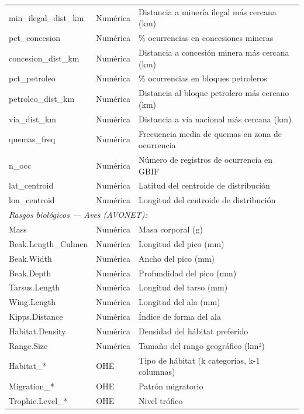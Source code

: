 \documentclass[12pt,a4paper]{article}
\begin{document}
\begin{longtable}{p{4.5cm}p{1.8cm}p{6.5cm}}
  min\_ilegal\_dist\_km & Numérica & Distancia a minería ilegal más cercana (km) \\
  pct\_concesion      & Numérica & \% ocurrencias en concesiones mineras \\
  concesion\_dist\_km & Numérica & Distancia a concesión minera más cercana (km) \\
  pct\_petroleo       & Numérica & \% ocurrencias en bloques petroleros \\
  petroleo\_dist\_km  & Numérica & Distancia al bloque petrolero más cercano (km) \\
  via\_dist\_km       & Numérica & Distancia a vía nacional más cercana (km) \\
  quemas\_freq        & Numérica & Frecuencia media de quemas en zona de ocurrencia \\
  n\_occ              & Numérica & Número de registros de ocurrencia en GBIF \\
  lat\_centroid       & Numérica & Latitud del centroide de distribución \\
  lon\_centroid       & Numérica & Longitud del centroide de distribución \\
  \midrule
  \multicolumn{3}{l}{\textit{Rasgos biológicos --- Aves (AVONET):}} \\
  Mass                & Numérica   & Masa corporal (g) \\
  Beak.Length\_Culmen & Numérica   & Longitud del pico (mm) \\
  Beak.Width          & Numérica   & Ancho del pico (mm) \\
  Beak.Depth          & Numérica   & Profundidad del pico (mm) \\
  Tarsus.Length       & Numérica   & Longitud del tarso (mm) \\
  Wing.Length         & Numérica   & Longitud del ala (mm) \\
  Kipps.Distance      & Numérica   & Índice de forma del ala \\
  Habitat.Density     & Numérica   & Densidad del hábitat preferido \\
  Range.Size          & Numérica   & Tamaño del rango geográfico (km²) \\
  Habitat\_*          & OHE        & Tipo de hábitat (k categorías, k-1 columnas) \\
  Migration\_*        & OHE        & Patrón migratorio \\
  Trophic.Level\_*    & OHE        & Nivel trófico \\

\end{longtable}
\end{document}
